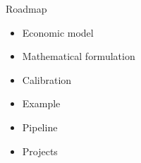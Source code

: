 \begin{frame}{Roadmap}\vspace{0.25cm}

\begin{multicols}{2}

		\begin{itemize}\setlength\itemsep{1em}
			\item Economic model
			\item Mathematical formulation
			\item Calibration
		\end{itemize}

		\pause

		\begin{itemize}\setlength\itemsep{1em}
			\item Example
			\item Pipeline
			\item Projects
		\end{itemize}

	\end{multicols}

\end{frame}
